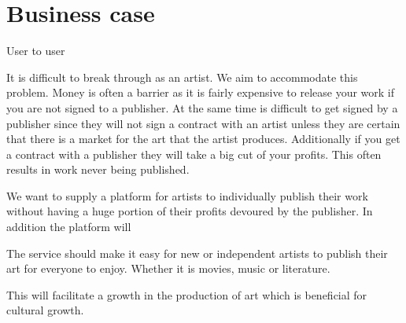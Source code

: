 \documentclass[]{article}
\title{}
\author{}
\begin{document}
\section{Business case}


User to user

It is difficult to break through as an artist. We aim to accommodate this problem. Money is often a barrier as it is fairly expensive to release your work if you are not signed to a publisher. At the same time is difficult to get signed by a publisher since they will not sign a contract with an artist unless they are certain that there is a market for the art that the artist produces. Additionally if you get a contract with a publisher they will take a big cut of your profits. This often results in work never being published. 

We want to supply a platform for artists to individually publish their work without having a huge portion of their profits devoured by the publisher. In addition the platform will

The service should make it easy for new or independent artists to publish their art for everyone to enjoy. Whether it is movies, music or literature. 

This will facilitate a growth in the production of art which is beneficial for cultural growth.  
\end{document}
